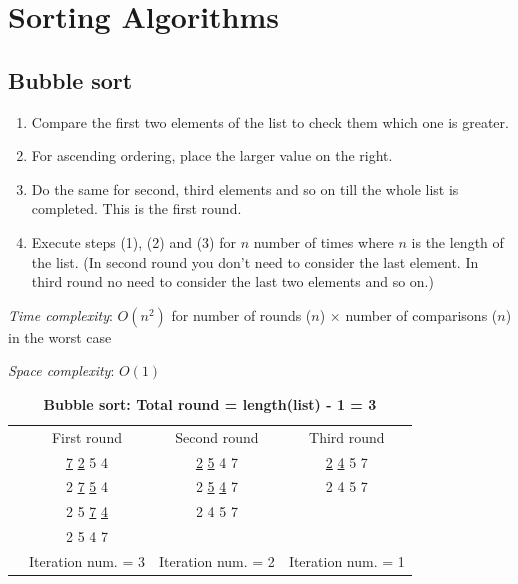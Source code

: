 \documentclass[a4paper,11pt]{book}
\begin{document}
\chapter{Sorting Algorithms}

\section{Bubble sort}

\begin{enumerate}
	\item Compare the first two elements of the list to check them which one is greater.
	\item For ascending ordering, place the larger value on the right.
	\item Do the same for second, third elements and so on till the whole list is completed. This is the first round.
	\item Execute steps (1), (2) and (3) for $n$ number of times where $n$ is the length of the list. (In second round you don't need to consider the last element. In third round no need to consider the last two elements and so on.)
\end{enumerate}

\noindent \textit{Time complexity}: $O(n^2)$ for number of rounds ($n$) $\times$ number of comparisons ($n$) in the worst case

\noindent \textit{Space complexity}: $O(1)$

\begin{table}[ht]
	\label{Bubble sort}
	\caption{\textbf{Bubble sort: Total round = length(list) - 1 = 3}}
	\vspace{2mm}
	\centering
	\begin{tabular}{cccc}
		&{First round}  &{Second round}  &{Third round}   \\
		&\underline{7} \underline{2} 5 4  &\underline{2} \underline{5} 4 7&\underline{2} \underline{4} 5 7\\
		
		&2 \underline{7} \underline{5} 4&2 \underline{5} \underline{4} 7  &2 4 5 7   \\
		&2 5 \underline{7} \underline{4}  &2 4 5 7 &   \\
		&2 5 4 7  & &\\
		&Iteration num. = 3 &Iteration num. = 2 &Iteration num. = 1 
	\end{tabular}
\end{table}
\end{document}
